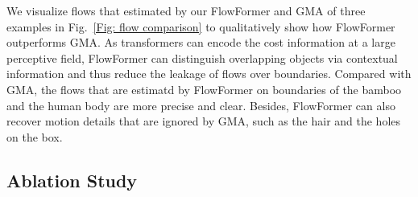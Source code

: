 We visualize flows that estimated by our FlowFormer and GMA of three examples in Fig.~\ref{Fig: flow comparison} to qualitatively show how FlowFormer outperforms GMA.
As transformers can encode the cost information at a large perceptive field, FlowFormer can distinguish overlapping objects via contextual information and thus reduce the leakage of flows over boundaries.
Compared with GMA, the flows that are estimatd by FlowFormer on boundaries of the bamboo and the human body are more precise and clear.
Besides, FlowFormer can also recover motion details that are ignored by GMA, such as the hair and the holes on the box.





\subsection{Ablation Study}


